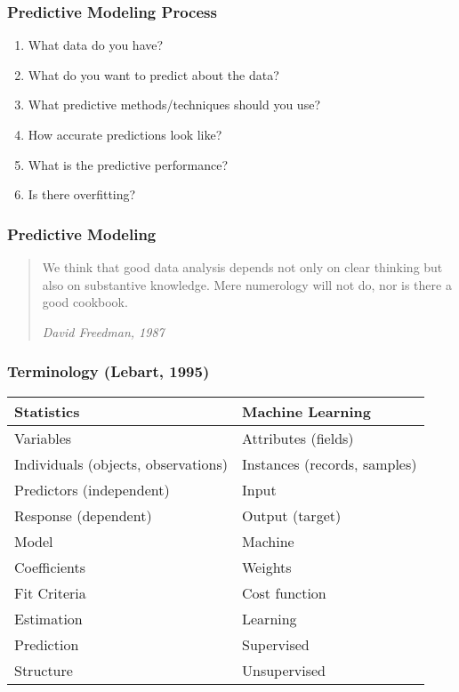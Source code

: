 \documentclass[12pt]{beamer}\usepackage[]{graphicx}\usepackage[]{color}
\begin{document}
\begin{frame}
\frametitle{Predictive Modeling Process}

\begin{enumerate}
  \item What data do you have?
  \item What do you want to predict about the data?
  \item What predictive methods/techniques should you use?
  \item How accurate predictions look like?
  \item What is the predictive performance?
  \item Is there overfitting?
\end{enumerate}
\eb

\end{frame}


\begin{frame}
\frametitle{Predictive Modeling}

{\large 
\begin{quotation}
\noindent We think that good data analysis depends not only on clear thinking but also on substantive knowledge. Mere numerology will not do, nor is there a good cookbook.

\bigskip
{\small \noindent \textit{David Freedman, 1987}}
\end{quotation}
}

\end{frame}


\begin{frame}
\frametitle{Terminology (Lebart, 1995)}

\small{
\begin{center}
 \begin{tabular}{l l}
  \hline
   Statistics & Machine Learning \\
  \hline
  Variables & Attributes (fields) \\
  Individuals (objects, observations) & Instances (records, samples) \\
  Predictors (independent) & Input \\  
  Response (dependent) & Output (target) \\
  Model & Machine \\
  Coefficients & Weights \\
  Fit Criteria & Cost function \\
  Estimation & Learning \\
  Prediction & Supervised \\
  Structure & Unsupervised \\
  \hline
 \end{tabular}
\end{center}
}

\end{frame}
\end{document}
